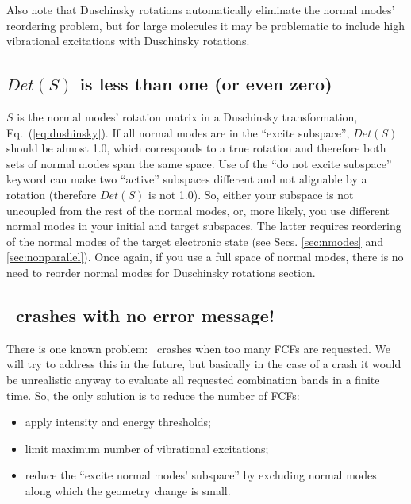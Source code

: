 \documentclass[11pt]{article}
\begin{document}

Also note that Duschinsky rotations automatically eliminate the normal modes' reordering problem, but for
large molecules it may be problematic to include high vibrational excitations with Duschinsky rotations.


\subsection{$Det(S)$ is less than one (or even zero)}
\label{sec:detS}

$S$ is the normal modes' rotation matrix in a Duschinsky transformation, Eq.~(\ref{eq:dushinsky}).
If all normal modes are in the ``excite subspace'', $Det(S)$ should be almost 1.0, 
which corresponds to a true rotation and therefore both sets of normal modes span the same space.  Use of the ``do not excite subspace'' keyword can make two ``active''
subspaces different and not alignable by a rotation (therefore $Det(S)$ is not 1.0).
So, either your subspace is not uncoupled from the rest of the normal modes, or, 
more likely, you use different normal modes in your initial and target subspaces.
The latter requires reordering of the normal modes of the target electronic state
(see Secs. \ref{sec:nmodes} and \ref{sec:nonparallel}).
Once again, if you use a full space of normal modes, there is no need to reorder normal modes for Duschinsky rotations section.

\subsection{\ezFCF\ crashes with no error message!}
\label{sec:crash}

There is one known problem: \ezFCF\ crashes when too many FCFs are requested.
We will try to address this in the future, 
but basically in the case of a crash it would be unrealistic anyway to evaluate all requested combination bands 
in a finite time.
So, the only solution is to reduce the number of FCFs:
\begin{itemize}
\item apply intensity and energy thresholds;  
\item limit maximum number of vibrational excitations; 
\item reduce the ``excite normal modes' subspace'' by excluding normal modes along which the geometry change is small.
\end{itemize}
\end{document}
